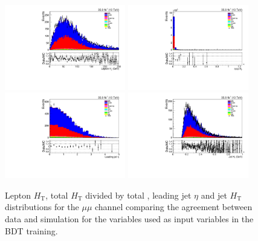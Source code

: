 \begin{figure}[htb]
\centering
\includegraphics[width=0.47\textwidth]{figs/background-estimation/plots/unblinded/prompt_mumu_ttbarInc/lepHt_NPL_mumu_wMass_mumu.pdf}
\includegraphics[width=0.47\textwidth]{figs/background-estimation/plots/unblinded/prompt_mumu_ttbarInc/totHtOverPt_NPL_mumu_wMass_mumu.pdf}
\\
\includegraphics[width=0.47\textwidth]{figs/background-estimation/plots/unblinded/prompt_mumu_ttbarInc/leadingJetEta_NPL_mumu_wMass_mumu.pdf}
\includegraphics[width=0.47\textwidth]{figs/background-estimation/plots/unblinded/prompt_mumu_ttbarInc/jetHt_NPL_mumu_wMass_mumu.pdf}
\caption{
Lepton ${\ensuremath{H_{\mathrm{T}}}}$, total ${\ensuremath{H_{\mathrm{T}}}}$ divided by total \pt, leading jet $\eta$ and jet ${\ensuremath{H_{\mathrm{T}}}}$ distributions for the $\mu\mu$ channel comparing the agreement between data and simulation for the variables used as input variables in the BDT training.}
\label{fig:appInputFeaturesDataSimAgreement12}
\end{figure}


